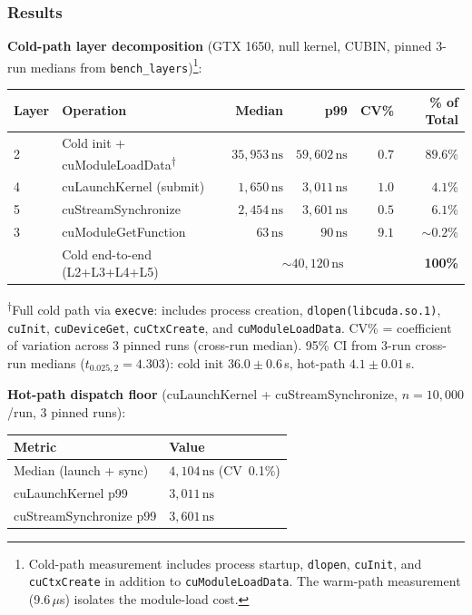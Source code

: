 \documentclass[10pt]{article}
\begin{document}
\subsubsection{Results}

\textbf{Cold-path layer decomposition} (GTX 1650, null kernel, CUBIN, pinned 3-run medians from \texttt{bench\_layers})\footnote{Cold-path measurement includes process startup, \texttt{dlopen}, \texttt{cuInit}, and \texttt{cuCtxCreate} in addition to \texttt{cuModuleLoadData}. The warm-path measurement (9.6\,$\mu$s) isolates the module-load cost.}:

\begin{center}
\footnotesize
\begin{tabular}{llrrrr}
  \toprule
  Layer & Operation & Median & p99 & CV\% & \% of Total \\
  \midrule
  2 & Cold init + cuModuleLoadData\textsuperscript{$\dagger$} & $35{,}953\,\text{ns}$ & $59{,}602\,\text{ns}$ & $0.7$ & $89.6\%$ \\
  4 & cuLaunchKernel (submit) & $1{,}650\,\text{ns}$ & $3{,}011\,\text{ns}$ & $1.0$ & $4.1\%$ \\
  5 & cuStreamSynchronize & $2{,}454\,\text{ns}$ & $3{,}601\,\text{ns}$ & $0.5$ & $6.1\%$ \\
  3 & cuModuleGetFunction & $63\,\text{ns}$ & $90\,\text{ns}$ & $9.1$ & ${\sim}0.2\%$ \\
  \midrule
  & Cold end-to-end (L2+L3+L4+L5) & \multicolumn{3}{c}{${\sim}40{,}120\,\text{ns}$} & \textbf{100\%} \\
  \bottomrule
\end{tabular}
\normalsize
\end{center}

{\footnotesize\textsuperscript{$\dagger$}Full cold path via \texttt{execve}: includes process creation, \texttt{dlopen(libcuda.so.1)}, \texttt{cuInit}, \texttt{cuDeviceGet}, \texttt{cuCtxCreate}, and \texttt{cuModuleLoadData}. CV\% = coefficient of variation across 3 pinned runs (cross-run median).
95\% CI from 3-run cross-run medians ($t_{0.025,2}{=}4.303$): cold init $36.0 \pm 0.6$\,\textmu{}s, hot-path $4.1 \pm 0.01$\,\textmu{}s.}

\textbf{Hot-path dispatch floor} (cuLaunchKernel + cuStreamSynchronize, $n{=}10{,}000$/run, 3 pinned runs):

\begin{center}
\footnotesize
\begin{tabular}{ll}
  \toprule
  Metric & Value \\
  \midrule
  Median (launch + sync) & $4{,}104\,\text{ns}$ (CV~0.1\%) \\
  cuLaunchKernel p99 & $3{,}011\,\text{ns}$ \\
  cuStreamSynchronize p99 & $3{,}601\,\text{ns}$ \\
  \bottomrule
\end{tabular}
\normalsize
\end{center}
\end{document}
